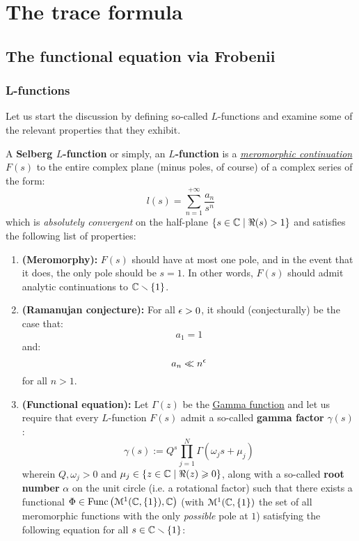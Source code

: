 \section{The trace formula}
    \subsection{The functional equation via Frobenii}
        \subsubsection{L-functions}
            Let us start the discussion by defining so-called $L$-functions  and examine some of the relevant properties that they exhibit. 
                
            \begin{definition} \label{def: selberg_L_functions} 
                A \textbf{Selberg $L$-function} or simply, an \textbf{$L$-function} is a \textit{\href{https://en.wikipedia.org/wiki/Analytic_continuation}{\underline{meromorphic continuation}}} $F(s)$ to the entire complex plane (minus poles, of course) of a complex series of the form:
                    $$l(s) = \sum_{n = 1}^{+\infty} \frac{a_n}{s^n}$$
                which is \textit{absolutely convergent} on the half-plane $\{s \in \mathbb{C} \mid \Re(s) > 1 \}$ and satisfies the following list of properties:
                    \begin{enumerate}
                        \item \textbf{(Meromorphy):} $F(s)$ should have at most one pole, and in the event that it does, the only pole should be $s = 1$. In other words, $F(s)$ should admit analytic continuations to $\mathbb{C} \smallsetminus \{1\}$.
                        \item \textbf{(Ramanujan conjecture):} For all $\epsilon > 0$, it should (conjecturally) be the case that:
                            $$a_1 = 1$$
                        and:
                            $$a_n \ll n^{\epsilon}$$
                        for all $n > 1$. 
                        \item \textbf{(Functional equation):} Let $\Gamma(z)$ be the \href{https://en.wikipedia.org/wiki/Gamma_function}{\underline{Gamma function}} and let us require that every $L$-function $F(s)$ admit a so-called \textbf{gamma factor} $\gamma(s)$:
                            $$\gamma(s) := Q^s \prod_{j = 1}^N \Gamma(\omega_j s + \mu_j)$$
                        wherein $Q, \omega_j > 0$ and $\mu_j \in \{z \in \mathbb{C} \mid \Re(z) \geqslant 0\}$, along with a so-called \textbf{root number} $\alpha$ on the unit circle (i.e. a rotational factor) such that there exists a functional $\Phi \in \mathrm{Func}\left(\mathcal{M}^1(\mathbb{C}, \{1\}), \mathbb{C}\right)$ (with $\mathcal{M}^1(\mathbb{C}, \{1\})$ the set of all meromorphic functions with the only \textit{possible} pole at $1$) satisfying the following equation for all $s \in \mathbb{C} \smallsetminus \{1\}$:

\end{enumerate}
\end{definition}
